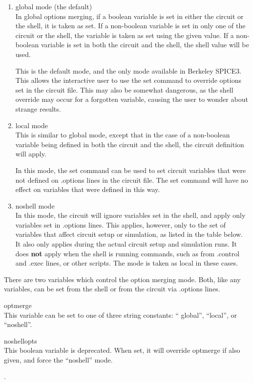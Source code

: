 \begin{enumerate}
\item{{\vt global} mode (the default)\\
In global options merging, if a boolean variable is set in either the
circuit or the shell, it is taken as set.  If a non-boolean variable
is set in only one of the circuit or the shell, the variable is taken
as set using the given value.  If a non-boolean variable is set in
both the circuit and the shell, the shell value will be used.

This is the default mode, and the only mode available in Berkeley
SPICE3.  This allows the interactive user to use the {\cb set} command
to override options set in the circuit file.  This may also be
somewhat dangerous, as the shell override may occur for a forgotten
variable, causing the user to wonder about strange results.}

\item{{\vt local} mode\\
This is similar to {\vt global} mode, except that in the case of a
non-boolean variable being defined in both the circuit and the shell,
the circuit definition will apply.

In this mode, the {\cb set} command can be used to set circuit
variables that were not defined on {\vt .options} lines in the circuit
file.  The {\cb set} command will have no effect on variables that
were defined in this way.}

\item{{\vt noshell} mode\\
In this mode, the circuit will ignore variables set in the shell, and
apply only variables set in {\vt .options} lines.  This applies,
however, only to the set of variables that affect circuit setup or
simulation, as listed in the table below.  It also only applies during
the actual circuit setup and simulation runs.  It does {\bf not} apply
when the shell is running commands, such as from {\vt .control} and
{\vt .exec} lines, or other scripts.  The mode is taken as {\vt local}
in these cases.}
\end{enumerate}

There are two variables which control the option merging mode.  Both,
like any variables, can be set from the shell or from the circuit via
{\vt .options} lines.

\begin{description}
\item{\vt optmerge}\\
This variable can be set to one of three string constants:  ``{\vt
global}'', ``{\vt local}'', or ``{\vt noshell}''.

\item{\vt noshellopts}\\
This boolean variable is deprecated.  When set, it will override {\vt
optmerge} if also given, and force the ``{\vt noshell}'' mode.
\end{description}.

